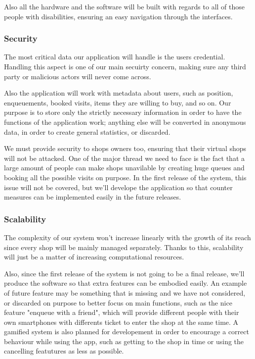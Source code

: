 Also all the hardware and the software will be built with regards to all of those people with disabilities, ensuring an easy navigation through the interfaces.

\subsubsection{Security}
\label{subsubsect:security}

The most critical data our application will handle is the users credential. Handling this aspect is one of our main secuirty concern, making sure any third party or malicious actors will never come across. 

Also the application will work with metadata about users, such as position, enqueuements, booked visits, items they are willing to buy, and so on. Our purpose is to store only the strictly necessary information in order to have the functions of the application work; anything else will be converted in anonymous data, in order to create general statistics, or discarded.

We must provide security to shops owners too, ensuring that their virtual shops will not be attacked. One of the major thread we need to face is the fact that a large amount of people can make shops unavilable by creating huge queues and booking all the possible visits on purpose. In the first release of the system, this issue will not be covered, but we'll develope the application so that counter measures can be implemented easily in the future releases.

\subsubsection{Scalability}
\label{subsubsect:scalability}

The complexity of our system won't increase linearly with the growth of its reach since every shop will be mainly managed separately.
Thanks to this, scalability will just be a matter of increasing computational resources. 

Also, since the first release of the system is not going to be a final release, we'll produce the software so that extra features can be embodied easily. An example of future feature may be something that is missing and we have not considered, or discarded on purpose to better focus on main functions, such as the nice feature "enqueue with a friend", which will provide different people with their own smartphones with differents ticket to enter the shop at the same time. A gamified system is also planned for developement in order to encourage a correct behaviour while using the app, such as getting to the shop in time or using the cancelling featutures as less as possible.

